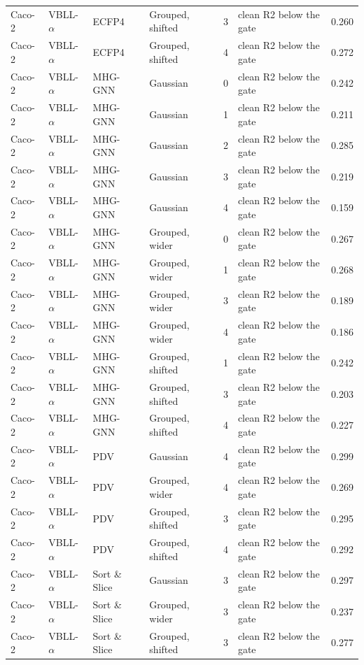 {\begin{longtable}{llllcll}
Caco-2 & VBLL-$\alpha$ & ECFP4 & Grouped, shifted & 3 & clean R2 below the gate & 0.260 \\
Caco-2 & VBLL-$\alpha$ & ECFP4 & Grouped, shifted & 4 & clean R2 below the gate & 0.272 \\
Caco-2 & VBLL-$\alpha$ & MHG-GNN & Gaussian & 0 & clean R2 below the gate & 0.242 \\
Caco-2 & VBLL-$\alpha$ & MHG-GNN & Gaussian & 1 & clean R2 below the gate & 0.211 \\
Caco-2 & VBLL-$\alpha$ & MHG-GNN & Gaussian & 2 & clean R2 below the gate & 0.285 \\
Caco-2 & VBLL-$\alpha$ & MHG-GNN & Gaussian & 3 & clean R2 below the gate & 0.219 \\
Caco-2 & VBLL-$\alpha$ & MHG-GNN & Gaussian & 4 & clean R2 below the gate & 0.159 \\
Caco-2 & VBLL-$\alpha$ & MHG-GNN & Grouped, wider & 0 & clean R2 below the gate & 0.267 \\
Caco-2 & VBLL-$\alpha$ & MHG-GNN & Grouped, wider & 1 & clean R2 below the gate & 0.268 \\
Caco-2 & VBLL-$\alpha$ & MHG-GNN & Grouped, wider & 3 & clean R2 below the gate & 0.189 \\
Caco-2 & VBLL-$\alpha$ & MHG-GNN & Grouped, wider & 4 & clean R2 below the gate & 0.186 \\
Caco-2 & VBLL-$\alpha$ & MHG-GNN & Grouped, shifted & 1 & clean R2 below the gate & 0.242 \\
Caco-2 & VBLL-$\alpha$ & MHG-GNN & Grouped, shifted & 3 & clean R2 below the gate & 0.203 \\
Caco-2 & VBLL-$\alpha$ & MHG-GNN & Grouped, shifted & 4 & clean R2 below the gate & 0.227 \\
Caco-2 & VBLL-$\alpha$ & PDV & Gaussian & 4 & clean R2 below the gate & 0.299 \\
Caco-2 & VBLL-$\alpha$ & PDV & Grouped, wider & 4 & clean R2 below the gate & 0.269 \\
Caco-2 & VBLL-$\alpha$ & PDV & Grouped, shifted & 3 & clean R2 below the gate & 0.295 \\
Caco-2 & VBLL-$\alpha$ & PDV & Grouped, shifted & 4 & clean R2 below the gate & 0.292 \\
Caco-2 & VBLL-$\alpha$ & Sort \& Slice & Gaussian & 3 & clean R2 below the gate & 0.297 \\
Caco-2 & VBLL-$\alpha$ & Sort \& Slice & Grouped, wider & 3 & clean R2 below the gate & 0.237 \\
Caco-2 & VBLL-$\alpha$ & Sort \& Slice & Grouped, shifted & 3 & clean R2 below the gate & 0.277 \\

\end{longtable}}
